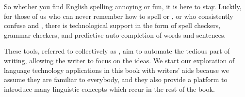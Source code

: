 
  


So whether you find English spelling annoying or fun, it is here to stay. 
Luckily, for those of us who can never remember how to spell
 or , or who consistently
confuse  and , there is technological
support in the form of spell checkers, grammar checkers, and predictive auto-completion of words and sentences.


These tools,  referred to collectively as ,  aim to automate the tedious part of writing, allowing the writer to focus on the ideas.
   We start our exploration of language technology applications
in this book with writers' aids because we assume they are familiar to
everybody, and they also provide a platform to introduce many
linguistic concepts which recur in the rest of the book. 

